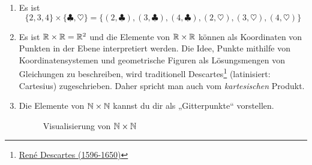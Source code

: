 \begin{bsp} \quad
    \begin{enumerate}
        \item Es ist
            \[ \{2,3,4\}\times \{ \clubsuit,\heartsuit\} = \{ (2,\clubsuit), (3,\clubsuit), (4,\clubsuit), (2,\heartsuit), (3,\heartsuit), (4,\heartsuit) \}\]
        \item Es ist $\mathbb R\times \mathbb R=\mathbb R^2$ und die Elemente von $\mathbb R\times \mathbb R$ können als Koordinaten von Punkten in der Ebene interpretiert werden. Die Idee, Punkte mithilfe von Koordinatensystemen und geometrische Figuren als Lösungsmengen von Gleichungen zu beschreiben, wird traditionell Descartes\footnote{\href{https://de.wikipedia.org/wiki/Rene_Descartes}{René Descartes (1596-1650)}} (latinisiert: Cartesius) zugeschrieben. Daher spricht man auch vom \emph{kartesischen} Produkt.
        \item Die Elemente von $\mathbb N\times \mathbb N$ kannst du dir als „Gitterpunkte“ vorstellen.
        \begin{figure}[ht]
        \centering \caption{Visualisierung von $\mathbb N\times \mathbb N$}
        \end{figure}
    \end{enumerate}
\end{bsp}


